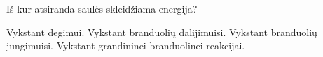 \question Iš kur atsiranda saulės skleidžiama energija? \begin{choices}
    \choice Vykstant degimui.
    \choice Vykstant branduolių dalijimuisi.
    \choice Vykstant branduolių jungimuisi.
    \choice Vykstant grandininei branduolinei reakcijai.
\end{choices}